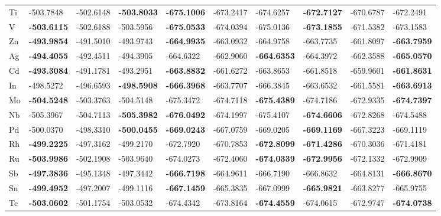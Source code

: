 \documentclass[a4paper, 12pt]{article}
\begin{document}
\begin{table}[htbp]
{\begin{tabular}{l *{9}{l}}
      Ti & -503.7848 & -502.6148 & \textbf{-503.8033} & \textbf{-675.1006} & -673.2417 & -674.6257 & \textbf{-672.7127} & -670.6787 & -672.2491 \\
      V  & \textbf{-503.6115} & -502.6188 & -503.5956 & \textbf{-675.0533} & -674.0394 & -675.0136 & \textbf{-673.1855} & -671.5382 & -673.1583 \\
      Zn & \textbf{-493.9854} & -491.5010 & -493.9743 & \textbf{-664.9935} & -663.0932 & -664.9758 & -663.7735 & -661.8097 & \textbf{-663.7959} \\
      Ag & \textbf{-494.4055} & -492.4511 & -494.3905 & -664.6322 & -662.9060 & \textbf{-664.6353} & -664.3972 & -662.3588 & \textbf{-665.0570} \\
      Cd & \textbf{-493.3084} & -491.1781 & -493.2951 & \textbf{-663.8832} & -661.6272 & -663.8653 & -661.8518 & -659.9601 & \textbf{-661.8631} \\
      In & -498.5272 & -496.6593 & \textbf{-498.5908} & \textbf{-666.3968} & -663.7707 & -666.3845 & -663.6532 & -661.5581 & \textbf{-663.6913} \\
      Mo & \textbf{-504.5248} & -503.3763 & -504.5148 & -675.3472 & -674.7118 & \textbf{-675.4389} & -674.7186 & -672.9335 & \textbf{-674.7397} \\
      Nb & -505.3967 & -504.7113 & \textbf{-505.3982} & \textbf{-676.0492} & -674.1997 & -675.4107 & \textbf{-674.6606} & -672.8268 & -674.5488 \\
      Pd & -500.0370 & -498.3310 & \textbf{-500.0455} & \textbf{-669.0243} & -667.0759 & -669.0205 & \textbf{-669.1169} & -667.3223 & -669.1119 \\
      Rh & \textbf{-499.2225} & -497.3162 & -499.2170 & -672.7920 & -670.7853 & \textbf{-672.8099} & \textbf{-671.4286} & -670.3036 & -671.4181 \\
      Ru & \textbf{-503.9986} & -502.1908 & -503.9640 & -674.0273 & -672.4060 & \textbf{-674.0339} & \textbf{-672.9956} & -672.1332 & -672.9909 \\
      Sb & \textbf{-497.3836} & -495.1348 & -497.3442 & \textbf{-666.7198} & -664.9611 & -666.7190 & -666.8632 & -664.8131 & \textbf{-666.8670} \\
      Sn & \textbf{-499.4952} & -497.2007 & -499.1116 & \textbf{-667.1459} & -665.3835 & -667.0999 & \textbf{-665.9821} & -663.8277 & -665.9755 \\
      Tc & \textbf{-503.0602} & -501.1754 & -503.0532 & -674.4342 & -673.8164 & \textbf{-674.4559} & -674.0615 & -672.9747 & \textbf{-674.0738} \\

\end{tabular}}
\end{table}
\end{document}
